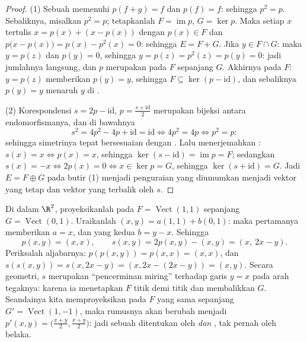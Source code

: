 \begin{proof}
(1) Sebuah  memenuhi $p(f + g) = f$ dan $p(f) = f$: sehingga $p^2 = p$.
Sebaliknya, misalkan $p^2 = p$; tetapkanlah $F = \operatorname{im} p$, $G = \ker
p$. Maka setiap $x$ tertulis $x = p(x) + (x - p(x))$ dengan $p(x) \in F$ dan
$p\bigl(x - p(x)\bigr) = p(x) - p^2(x) = 0$: sehingga $E = F + G$. Jika $y \in
F \cap G$: maka $y = p(z)$ dan $p(y) = 0$, sehingga $y = p(z) = p^2(z) = p(y) =
0$: jadi jumlahnya langsung, dan $p$ merupakan  pada $F$ sepanjang $G$.
Akhirnya pada $F$: $y = p(z)$ memberikan $p(y) = y$, sehingga $F \subseteq
\ker(p - \mathrm{id})$, dan sebaliknya $p(y) = y$ menaruh $y$ di
.

(2) Korespondensi $s = 2p - \mathrm{id}$, $p = \frac{s +
\mathrm{id}}2$ merupakan bijeksi antara endomorfismanya, dan di bawahnya
\[
s^2 = 4p^2 - 4p + \mathrm{id} = \mathrm{id}
\iff 4p^2 = 4p \iff p^2 = p :
\]
sehingga simetrinya tepat bersesuaian dengan . Lalu menerjemahkan
: $s(x) = x \iff p(x) = x$, sehingga $\ker(s - \mathrm{id}) =
\operatorname{im} p = F$; sedangkan $s(x) = -x \iff 2p(x) = 0 \iff x
\in \ker p = G$, sehingga $\ker(s + \mathrm{id}) = G$. Jadi 
$E = F \oplus G$ pada butir (1) menjadi penguraian yang diumumkan
menjadi vektor yang tetap dan vektor yang terbalik oleh $s$.
\end{proof}

\begin{example}
\label{ex:b1:linmaps:projexplicit}
Di dalam $\R^2$, proyeksikanlah pada $F = \operatorname{Vect}(1,1)$ sepanjang $G =
\operatorname{Vect}(0,1)$. Uraikanlah $(x, y) = a(1,1) + b(0,1)$:
maka  pertamanya memberikan $a = x$, dan yang kedua $b = y - x$.
Sehingga
\[
p(x, y) = (x, x),
\qquad
s(x, y) = 2p(x,y) - (x,y) = (x,\ 2x - y).
\]
Periksalah aljabarnya: $p(p(x,y)) = p(x,x) = (x,x)$, dan $s(s(x,y)) =
s(x, 2x - y) = (x, 2x - (2x - y)) = (x, y)$. Secara geometri, $s$
merupakan ``pencerminan miring'' terhadap garis $y = x$ pada arah
tegaknya: karena ia menetapkan $F$ titik demi titik dan membalikkan $G$. Seandainya
kita memproyeksikan pada $F$ yang sama sepanjang $G' =
\operatorname{Vect}(1,-1)$, maka rumusnya akan berubah menjadi
$p'(x,y) = \bigl(\frac{x+y}2, \frac{x+y}2\bigr)$: jadi sebuah 
ditentukan oleh  \emph{dan} , tak pernah oleh 
belaka.
\end{example}

